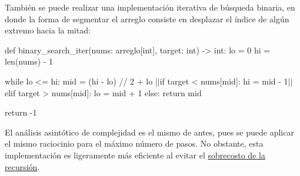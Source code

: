 También se puede realizar una implementación iterativa de búsqueda binaria, en donde la forma de segmentar el arreglo consiste en desplazar el índice de algún extremo hacia la mitad:
\begin{codeblock}
\begin{pseudocode}
def binary_search_iter(nums: arreglo[int], target: int) -> int:
    lo = 0
    hi = len(nums) - 1

    while lo <= hi:
        mid = (hi - lo) // 2 + lo
        ||if target < nums[mid]:
            hi = mid - 1||
        elif target > nums[mid]:
            lo = mid + 1
        else:
            return mid

    return -1
\end{pseudocode}
\begin{annotations}
\end{annotations}
\end{codeblock}

El análisis asintótico de complejidad es el mismo de antes, pues se puede aplicar el mismo raciocinio para el máximo número de pasos. No obstante, esta implementación es ligeramente más eficiente al evitar el \hyperref[sec:sobrecosto_recursion]{sobrecosto de la recursión}.

